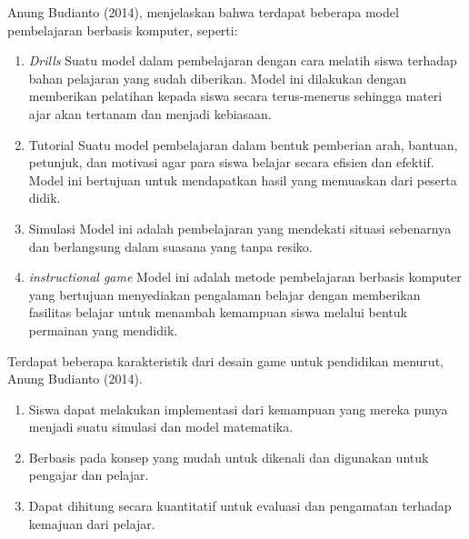 	Anung Budianto (2014), menjelaskan bahwa terdapat beberapa model pembelajaran berbasis komputer, seperti:
	\begin{enumerate}
		\item \textit{Drills}
			\subitem Suatu model dalam pembelajaran dengan cara melatih siswa terhadap bahan pelajaran yang sudah diberikan. Model ini dilakukan dengan memberikan pelatihan kepada siswa secara terus-menerus sehingga materi ajar akan tertanam dan menjadi kebiasaan.
		\item Tutorial
			\subitem Suatu model pembelajaran dalam bentuk pemberian arah, bantuan, petunjuk, dan motivasi agar para siswa belajar secara efisien dan efektif. Model ini bertujuan untuk mendapatkan hasil yang memuaskan dari peserta didik.
		\item Simulasi
			\subitem Model ini adalah pembelajaran yang mendekati situasi sebenarnya dan berlangsung dalam suasana yang tanpa resiko.
		\item \textit{instructional game}
			\subitem Model ini adalah metode pembelajaran berbasis komputer yang bertujuan menyediakan pengalaman belajar dengan memberikan fasilitas belajar untuk menambah kemampuan siswa melalui bentuk permainan yang mendidik.
	\end{enumerate}
	
	Terdapat beberapa karakteristik dari desain game untuk pendidikan menurut, Anung Budianto (2014).
	\begin{enumerate}
		\item Siswa dapat melakukan implementasi dari kemampuan yang mereka punya menjadi suatu simulasi dan model matematika.
		\item Berbasis pada konsep yang mudah untuk dikenali dan digunakan untuk pengajar dan pelajar.
		\item Dapat dihitung secara kuantitatif untuk evaluasi dan pengamatan terhadap kemajuan dari pelajar.
	\end{enumerate}
	
